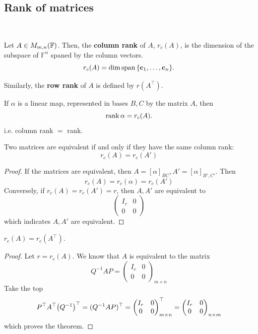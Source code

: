 \documentclass[a4paper]{article}
\begin{document}
\subsection{Rank of matrices}\ \vspace*{-1.5em}
\begin{definition}
	Let $ A \in M_{m,n}({\mathbb{F}}) $.
	Then, the \textbf{column rank} of $ A $, $ r_c(A) $, is the dimension of the subspace of $ \mathbb{F}^n $ spaned by the column vectors.
	\[
		r_c(A) = \dim \operatorname{span} \qty{{\bf c}_1, \dots, {\bf c}_n}.
	\]

    Similarly, the \textbf{row rank} of $A$ is defined by $ r(A^\top) $.
\end{definition}

\begin{remark}
	If $ \alpha $ is a linear map, represented in bases $ B, C $ by the matrix $ A $, then
	\[
		\rank \alpha = r_c(A). 
	\]
    i.e. column rank $=$ rank.
\end{remark}

\begin{proposition}
	Two matrices are equivalent if and only if they have the same column rank:
	\[
		r_c(A) = r_c(A')
	\]
\end{proposition}
\begin{proof}
	If the matrices are equivalent, then $ A = [\alpha]_{BC}, A' = [\alpha]_{B',C'} $.
	Then
	\[
		r_c(A) = r_c(\alpha) = r_c(A')
	\]
	Conversely, if $ r_c(A) = r_c(A') = r $, then $ A, A' $ are equivalent to
	\[
		\begin{pmatrix}
			I_r & 0 \\
			0   & 0
		\end{pmatrix}
	\]
	which indicates $ A, A' $ are equivalent.
\end{proof}

\begin{theorem}
    $ r_c(A) = r_c(A^\top) $. 
\end{theorem}
\begin{proof}
    Let $ r = r_c(A) $. We know that $A$ is equivalent to the matrix 
    \[
        Q^{-1}AP = \begin{pmatrix}
			I_r & 0 \\
			0   & 0
		\end{pmatrix}_{m\times n}
    \]
    Take the top
    \[
		P^\top A^\top \qty(Q^{-1})^\top = (Q^{-1}AP)^\top = \begin{pmatrix}
			I_r & 0 \\
			0   & 0
		\end{pmatrix}_{m \times n}^\top = \begin{pmatrix}
			I_r & 0 \\
			0   & 0
		\end{pmatrix}_{n \times m}
	\]
    which proves the theorem. 
\end{proof}
\end{document}
